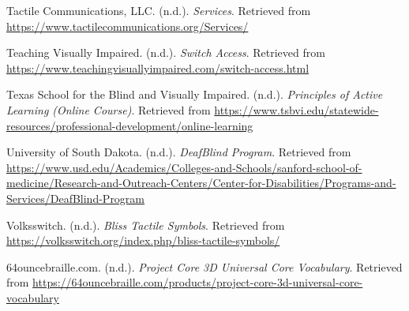 \begin{thebibliography}{99}
 Tactile Communications, LLC. (n.d.). \textit{Services}. Retrieved from \url{https://www.tactilecommunications.org/Services/}

 Teaching Visually Impaired. (n.d.). \textit{Switch Access}. Retrieved from \url{https://www.teachingvisuallyimpaired.com/switch-access.html}

 Texas School for the Blind and Visually Impaired. (n.d.). \textit{Principles of Active Learning (Online Course)}. Retrieved from \url{https://www.tsbvi.edu/statewide-resources/professional-development/online-learning}

 University of South Dakota. (n.d.). \textit{DeafBlind Program}. Retrieved from \url{https://www.usd.edu/Academics/Colleges-and-Schools/sanford-school-of-medicine/Research-and-Outreach-Centers/Center-for-Disabilities/Programs-and-Services/DeafBlind-Program}

 Volksswitch. (n.d.). \textit{Bliss Tactile Symbols}. Retrieved from \url{https://volksswitch.org/index.php/bliss-tactile-symbols/}

 64ouncebraille.com. (n.d.). \textit{Project Core 3D Universal Core Vocabulary}. Retrieved from \url{https://64ouncebraille.com/products/project-core-3d-universal-core-vocabulary}

\end{thebibliography}
